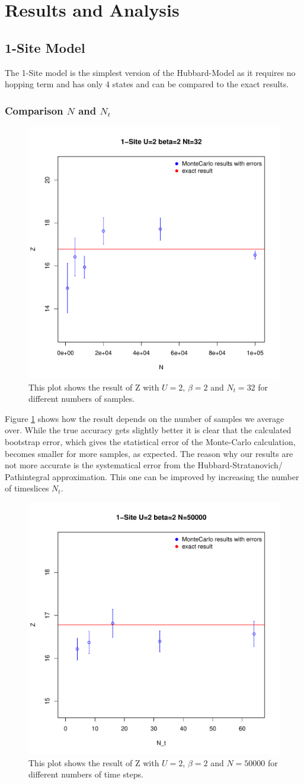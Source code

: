 
\section{Results and Analysis}
\subsection{1-Site Model}
The 1-Site model is the simplest version of the Hubbard-Model as it requires no hopping term and has only 4 states and can be compared to the exact results.
\subsubsection{Comparison $N$ and $N_t$}
\begin{figure}[H]
	\centering
	\includegraphics[width=0.5\linewidth]{figs/plot_Z1N}
	\caption[Scaling of Z with N]{This plot shows the result of Z with $U=2$, $\beta=2$ and $N_t=32$ for different numbers of samples.}
	\label{fig:plotz1n}
\end{figure}
Figure \ref{fig:plotz1n} shows how the result depends on the number of samples we average over. While the true accuracy gets slightly better it is clear that the calculated bootstrap error, which gives the statistical error of the Monte-Carlo calculation, becomes smaller for more samples, as expected. The reason why our results are not more accurate is the systematical error from the Hubbard-Stratanovich/ Pathintegral approximation. This one can be improved by increasing the number of timeslices $N_t$.
\begin{figure}[H]
	\centering
	\includegraphics[width=0.5\linewidth]{figs/plot_Z1Nt}
	\caption[Scaling of Z with N_t]{This plot shows the result of Z with $U=2$, $\beta=2$ and $N=50000$ for different numbers of time steps.}
	\label{fig:plotz1nt}
\end{figure}
